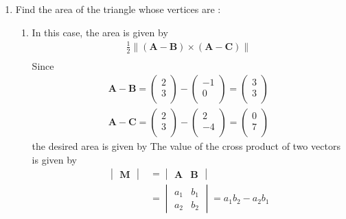 \documentclass[12pt]{article}
\newcommand{\mydet}[1]{\ensuremath{\begin{vmatrix}#1\end{vmatrix}}}
\providecommand{\brak}[1]{\ensuremath{\left(#1\right)}}
\providecommand{\norm}[1]{\left\lVert#1\right\rVert}
\newcommand{\myvec}[1]{\ensuremath{\begin{pmatrix}#1\end{pmatrix}}}
\let\vec\mathbf
\begin{document}
\begin{enumerate}
\item Find the area of the triangle whose vertices are :
	\fi
\begin{enumerate}
\item 
In this case, the area  is given by  
  \label{prop:10/7/3/1area2d}
  \begin{align}
    \label{eq:10/7/3/1area2d}
	\frac{1}{2}\norm{\brak{\vec{A}-\vec{B}} \times \brak{\vec{A}-\vec{C}}} \\
  \end{align}
  Since
  \begin{align}
	 \vec{A}-\vec{B} =  \myvec{
  2 \\
  3 \\
 } - \myvec{
  -1 \\
  0 \\
 } = \myvec{
 3 \\
 3 \\
 }
 \\
 \vec{A}-\vec{C} =  \myvec{
  2 \\
  3 \\
 } - \myvec{
  2 \\
  -4 \\
 } = \myvec{
 0 \\
 7 \\
 }
 \end{align}
 the desired area is given by 
 \iffalse
The value of the cross product of two vectors is given by
\begin{align}
  \label{eq:10/7/3/1det2d}
  \mydet{\vec{M}} &= \mydet{\vec{A} & \vec{B}} 
  \\
  &= \mydet{a_1 & b_1\\a_2 & b_2} = a_1b_2 - a_2 b_1
\end{align}


\end{enumerate}
\end{enumerate}
\end{document}
